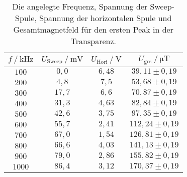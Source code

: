 \begin{table}[H]
    \centering
    \caption{Die angelegte Frequenz, Spannung der Sweep-Spule, Spannung der horizontalen Spule und Gesamtmagnetfeld für den ersten Peak in der Transparenz.}
    \label{tab:Messung1}
    \begin{tabular}{S S S S}
    \toprule
      $ f \mathbin{/} \unit{\kilo\hertz}$ & $U_{\text{Sweep}} \mathbin{/} \unit{\milli\volt}$ & $U_{\text{Hori}} \mathbin{/} \unit{\volt}$ & $U_{\text{ges}} \mathbin{/} \unit{\micro\tesla}$ \\
    \midrule
    $100$ &         $ 0,0$ &        $6,48$ & $39,11    \pm 0,19$       \\ 
    $200$ &         $ 4,8$ &        $7,5 $ & $53,68    \pm 0,19$       \\ 
    $300$ &         $17,7$ &        $6,6 $ & $70,87    \pm 0,19$       \\ 
    $400$ &         $31,3$ &        $4,63$ & $82,84    \pm 0,19$       \\ 
    $500$ &         $42,6$ &        $3,75$ & $97,35    \pm 0,19$       \\ 
    $600$ &         $55,7$ &        $2,41$ & $112,24   \pm 0,19$       \\ 
    $700$ &         $67,0$ &        $1,54$ & $126,81   \pm 0,19$       \\ 
    $800$ &         $66,6$ &        $4,03$ & $141,13   \pm 0,19$       \\ 
    $900$ &         $79,0$ &        $2,86$ & $155,82   \pm 0,19$       \\ 
    $1000$ &        $86,4$ &        $3,12$ & $170,37   \pm 0,19$       \\ 

    \bottomrule
    \end{tabular}
    \end{table}

